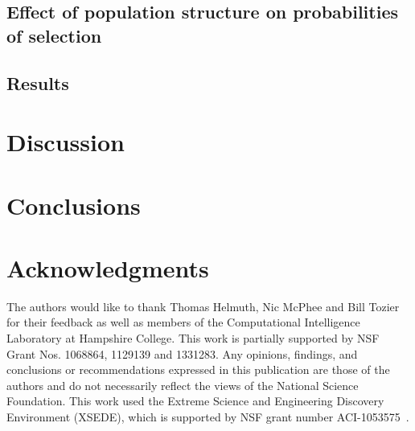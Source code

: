 \documentclass[preprint]{article}
\begin{document}
\subsection{Effect of population structure on probabilities of selection}


\subsection{Results}\label{s:4 results}

\section{Discussion}\label{s:5}


\section{Conclusions}\label{s:6}

\section{Acknowledgments}
The authors would like to thank Thomas Helmuth, Nic McPhee and Bill Tozier for their feedback as well as members of the Computational Intelligence Laboratory at Hampshire College. This work is partially supported by NSF Grant Nos. 1068864, 1129139 and 1331283. Any opinions, findings, and conclusions or recommendations expressed in this publication are those of the authors and do not necessarily reflect the views of the National Science Foundation. This work used the Extreme Science and Engineering Discovery Environment (XSEDE), which is supported by NSF grant number ACI-1053575~\cite{towns_xsede:_2014}.




\end{document}
